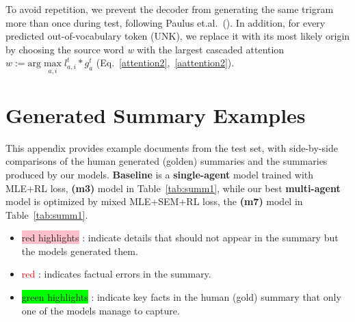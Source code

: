 \documentclass[11pt,a4paper]{article}
\begin{document}
To avoid repetition, we prevent the decoder from generating the same trigram more than once during test, following Paulus et.al.~(\citeyear{rlsummsocher}). In addition, for every predicted out-of-vocabulary token (UNK), we replace it with its most likely origin by choosing the source word \textit{w}
with the largest cascaded attention $w:=\text{arg}\max\limits_{a,i}l_{a,i}^t*g_a^t$ (Eq.~\eqref{attention2},~\eqref{aattention2}).

\section{Generated Summary Examples}
\label{app:generations}
This appendix provides example documents from the test set, with side-by-side comparisons of the human generated (golden) summaries
and the summaries produced by our models. \textbf{Baseline} is a \textbf{single-agent} model trained with MLE+RL loss, \textbf{(m3)} model in Table~\ref{tab:summ1}, while our best \textbf{multi-agent} model is optimized by mixed MLE+SEM+RL loss, the \textbf{(m7)} model in Table~\ref{tab:summ1}. 

\begin{itemize}
    \item \colorbox{pink}{red highlights} : indicate details that should not appear in the summary but the models generated them.
    \item \textcolor{red}{red} : indicates factual errors in the summary.
    \item \colorbox{lime}{green highlights} : indicate key facts in the human (gold) summary that only one of the models manage to capture.
\end{itemize}
\end{document}
